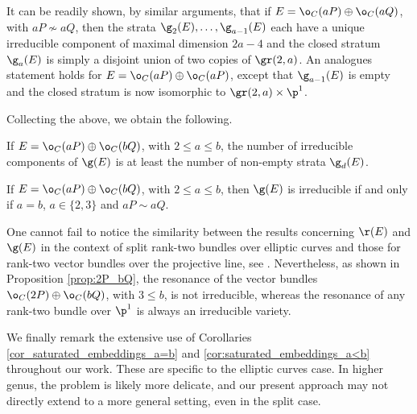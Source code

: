 \documentclass[10pt, leqno]{amsart}
\begin{document}
It can be readily shown, by similar arguments, that if $E = \o_C(aP) \oplus \o_C(aQ)$, with $aP \not\sim aQ$, then the strata $\g_2(E), \ldots, \g_{a-1}(E)$ each have a unique irreducible component of maximal dimension $2a - 4$ and the closed stratum $\g_a(E)$ is simply a disjoint union of two copies of $\gr(2,a)$. An analogues statement holds for $E = \o_C(aP) \oplus \o_C(aP)$, except that $\g_{a-1}(E)$ is empty and the closed stratum is now isomorphic to $\gr(2, a) \times \p^1$.

Collecting the above, we obtain the following.

\begin{prop} \label{prop:ired_comp_g(E)}
If $E = \o_C(aP) \oplus \o_C(bQ)$, with $2 \le a \le b$, the number of irreducible components of $\g(E)$ is at least the number of non-empty strata $\g_d(E)$.
\end{prop}

\begin{cor} \label{cor:ired_g(E)}
If $E = \o_C(aP) \oplus \o_C(bQ)$, with $2 \le a \le b$, then $\g(E)$ is irreducible if and only if $a = b$, $a \in \{2, 3\}$ and $aP \sim aQ$.
\end{cor}

One cannot fail to notice the similarity between the results concerning $\r(E)$ and $\g(E)$ in the context of split rank-two bundles over elliptic curves and those for rank-two vector bundles over the projective line, see \cite[Propositions 4.8, 4.10]{aprodu_linear_2025}. Nevertheless, as shown in Proposition \ref{prop:2P_bQ}, the resonance of the vector bundles $\o_C(2P) \oplus \o_C(bQ)$, with $3 \le b$, is not irreducible, whereas the resonance of any rank-two bundle over $\p^1$ is always an irreducible variety.

We finally remark the extensive use of Corollaries \ref{cor_saturated_embeddings_a=b} and \ref{cor:saturated_embeddings_a<b} throughout our work. These are specific to the elliptic curves case. In higher genus, the problem is likely more delicate, and our present approach may not directly extend to a more general setting, even in the split case.

\printbibliography
\end{document}
